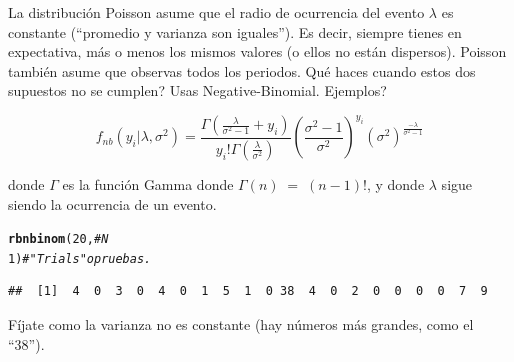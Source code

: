 \documentclass[onesided]{article}\usepackage[]{graphicx}\usepackage[]{color}
\makeatletter
\newcommand{\hlnum}[1]{\textcolor[rgb]{0.686,0.059,0.569}{#1}}%
\newcommand{\hlcom}[1]{\textcolor[rgb]{0.678,0.584,0.686}{\textit{#1}}}%
\newcommand{\hlstd}[1]{\textcolor[rgb]{0.345,0.345,0.345}{#1}}%
\newcommand{\hlkwd}[1]{\textcolor[rgb]{0.737,0.353,0.396}{\textbf{#1}}}%
\newenvironment{kframe}{%
 \def\at@end@of@kframe{}%
 \ifinner\ifhmode%
  \def\at@end@of@kframe{\end{minipage}}%
  \begin{minipage}{\columnwidth}%
 \fi\fi%
 \def\FrameCommand##1{\hskip\@totalleftmargin \hskip-\fboxsep
 \colorbox{shadecolor}{##1}\hskip-\fboxsep
     \hskip-\linewidth \hskip-\@totalleftmargin \hskip\columnwidth}%
 \MakeFramed {\advance\hsize-\width
   \@totalleftmargin\z@ \linewidth\hsize
   \@setminipage}}%
 {\par\unskip\endMakeFramed%
 \at@end@of@kframe}
\newenvironment{knitrout}{}{} %
\makeatother
\begin{document}
La distribuci\'on Poisson asume que el radio de ocurrencia del evento $\lambda$ es constante (``promedio y varianza son iguales''). Es decir, siempre tienes en expectativa, m\'as o menos los mismos valores (o ellos no est\'an dispersos). Poisson tambi\'en asume que observas todos los periodos. Qu\'e haces cuando estos dos supuestos no se cumplen? Usas Negative-Binomial. {\color{red}Ejemplos}? %

\begin{equation}\label{Neg.Bin}
f_{nb}(y_{i}|\lambda,\sigma^{2})  =	\frac{\Gamma(\frac{\lambda}{\sigma^{2}-1}+y_{i})}{y_{i}!\Gamma (\frac{\lambda}{\sigma^{2}})} (\frac{\sigma^{2}-1}{\sigma^{2}})^{y_{i}}(\sigma^{2})^{\frac{-\lambda}{\sigma^{2}-1}}
\end{equation}

donde $\Gamma$ es la funci\'on Gamma donde $\Gamma(n) \;=\; (n-1)!$, y donde $\lambda$ sigue siendo la ocurrencia de un evento.


\begin{knitrout}
\color{fgcolor}\begin{kframe}
\begin{alltt}
\hlkwd{rbnbinom}\hlstd{(}\hlnum{20}\hlstd{,} \hlcom{# N}
\hlnum{1}\hlstd{)} \hlcom{# "Trials" o pruebas.}
\end{alltt}
\begin{verbatim}
##  [1]  4  0  3  0  4  0  1  5  1  0 38  4  0  2  0  0  0  0  7  9
\end{verbatim}
\end{kframe}
\end{knitrout}

F\'ijate como la varianza no es constante (hay n\'umeros m\'as grandes, como el ``38'').

\clearpage
\newpage
{}
\setcounter{page}{1}
\end{document}
